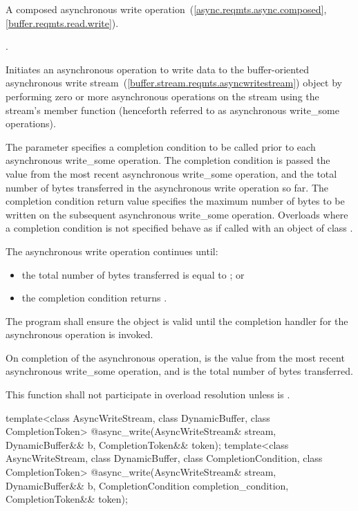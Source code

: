\begin{itemdescr}
\pnum
A composed asynchronous write operation~(\ref{async.reqmts.async.composed}, \ref{buffer.reqmts.read.write}).

\pnum
\completionsig {}.

\pnum
\effects Initiates an asynchronous operation to write data to the buffer-oriented asynchronous write stream~(\ref{buffer.stream.reqmts.asyncwritestream}) object  by performing zero or more asynchronous operations on the stream using the stream's  member function (henceforth referred to as asynchronous write_some operations).

\pnum
The  parameter specifies a completion condition to be called prior to each asynchronous write_some operation. The completion condition is passed the  value from the most recent asynchronous write_some operation, and the total number of bytes transferred in the asynchronous write operation so far. The completion condition return value specifies the maximum number of bytes to be written on the subsequent asynchronous write_some operation. Overloads where a completion condition is not specified behave as if called with an object of class .

\pnum
The asynchronous write operation continues until:

\begin{itemize}
\item
the total number of bytes transferred is equal to ; or
\item
the completion condition returns .
\end{itemize}

\pnum
The program shall ensure the  object  is valid until the completion handler for the asynchronous operation is invoked.

\pnum
On completion of the asynchronous operation,  is the  value from the most recent asynchronous write_some operation, and  is the total number of bytes transferred.

\pnum
\remarks This function shall not participate in overload resolution unless  is .
\end{itemdescr}

%
\begin{itemdecl}
template<class AsyncWriteStream, class DynamicBuffer, class CompletionToken>
  @\DEDUCED@ async_write(AsyncWriteStream& stream,
                      DynamicBuffer&& b, CompletionToken&& token);
template<class AsyncWriteStream, class DynamicBuffer, class CompletionCondition,
         class CompletionToken>
    @\DEDUCED@ async_write(AsyncWriteStream& stream,
                        DynamicBuffer&& b,
                        CompletionCondition completion_condition,
                        CompletionToken&& token);
\end{itemdecl}

